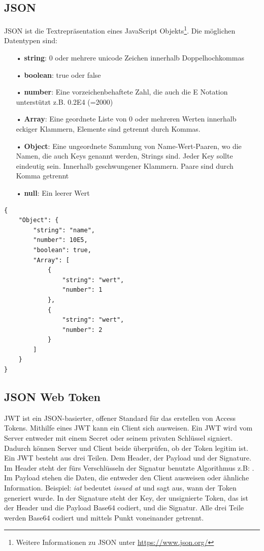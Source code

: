 \subsection{JSON}
\label{sec:vor-json}
\ac{JSON} ist die Textrepräsentation eines JavaScript Objekts\footnote{Weitere Informationen zu \ac{JSON} unter \url{https://www.json.org/}}. Die möglichen Datentypen sind:

\begin{itemize}
\item[•] \textbf{string}: 0 oder mehrere unicode Zeichen innerhalb Doppelhochkommas
\item[•] \textbf{boolean}: true oder false
\item[•] \textbf{number}: Eine vorzeichenbehaftete Zahl, die auch die E Notation unterstützt z.B. 0.2E4 (=2000)
\item[•] \textbf{Array}: Eine geordnete Liste von 0 oder mehreren Werten innerhalb eckiger Klammern, Elemente sind getrennt durch Kommas.
\item[•] \textbf{Object}: Eine ungeordnete Sammlung von Name-Wert-Paaren, wo die Namen, die auch Keys genannt werden, Strings sind. Jeder Key sollte eindeutig sein. Innerhalb geschwungener Klammern. Paare sind durch Komma getrennt
\item[•] \textbf{null}: Ein leerer Wert
\end{itemize}

\begin{lstlisting}[style=JSON,caption=\ac{JSON} Beispiel]
{
	"Object": {	
		"string": "name",
		"number": 10E5,
		"boolean": true,
		"Array": [
			{
				"string": "wert",
				"number": 1
			},
			{
				"string": "wert",
				"number": 2
			}
		]
	}
}
\end{lstlisting}

\subsection{JSON Web Token}
\label{sec:vor-jwt}
\ac{JWT} ist ein JSON-basierter, offener Standard für das erstellen von Access Tokens. Mithilfe eines \ac{JWT} kann ein Client sich ausweisen. Ein \ac{JWT} wird vom Server entweder mit einem Secret oder seinem privaten Schlüssel signiert. Dadurch können Server und Client beide überprüfen, ob der Token legitim ist. Ein \ac{JWT} besteht aus drei Teilen. Dem Header, der Payload und der Signature. Im Header steht der fürs Verschlüsseln der Signatur benutzte Algorithmus z.B: . Im Payload stehen die Daten, die entweder den Client ausweisen oder ähnliche Information. Beispiel:  \textit{iat} bedeutet \textit{issued at} und sagt aus, wann der Token generiert wurde. In der Signature steht der Key, der unsignierte Token, das ist der Header und die Payload Base64 codiert, und die Signatur. Alle drei Teile werden Base64 codiert und mittels Punkt voneinander getrennt.

